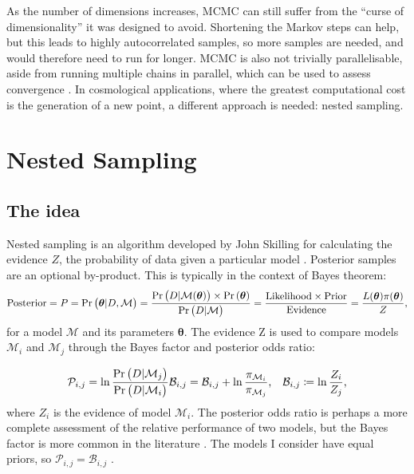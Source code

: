 \documentclass{article}
\begin{document}
As the number of dimensions increases, MCMC can still suffer from the ``curse of dimensionality'' it was designed to avoid. Shortening the Markov steps can help, but this leads to highly autocorrelated samples, so more samples are needed, and would therefore need to run for longer. MCMC is also not trivially parallelisable, aside from running multiple chains in parallel, which can be used to assess convergence \cite{mcmc-convergence}. In cosmological applications, where the greatest computational cost is the generation of a new point, a different approach is needed: nested sampling.


\section{Nested Sampling}
\subsection{The idea}
\label{sec:the-idea}
Nested sampling is an algorithm developed by John Skilling for calculating the evidence $Z$, the probability of data given a particular model \cite{skilling, Ashton_2022}. Posterior samples are an optional by-product. This is typically in the context of Bayes theorem:
\begin{equation}
  \textrm{Posterior} = P = \Pr\left(\bm{\theta}| D, \mathcal{M}\right) = \frac{\Pr\left(D|\mathcal{M}(\bm\theta)\right) \times \Pr\left(\bm\theta\right)}{\Pr\left(D|\mathcal{M}\right)} = \frac{\textrm{Likelihood} \times \textrm{Prior}}{\textrm{Evidence}} = \frac{L(\bm\theta) \pi(\bm{\theta})}{Z}\textrm,
  \label{bayes}
\end{equation}
%
for a model $\mathcal{M}$ and its parameters $\bm{\theta}$. The evidence Z is used to compare models $\mathcal{M}_i$ and $\mathcal{M}_j$ through the Bayes factor and posterior odds ratio:

\begin{equation}
  \mathcal{P}_{i, j} = \ln\frac{\Pr\left(D|\mathcal{M}_j\right)}{\Pr\left(D|\mathcal{M}_i\right)}
  \mathcal{B}_{i, j} = \mathcal{B}_{i, j} + \ln\frac{\pi_{\mathcal{M}_i}}{\pi_{\mathcal{M}_j}} \textrm, \quad \mathcal B_{i, j} \coloneqq \ln\frac{Z_i}{Z_j} \textrm,
\end{equation}
%
where $Z_i$ is the evidence of model $\mathcal M_i$. The posterior odds ratio is perhaps a more complete assessment of the relative performance of two models, but the Bayes factor is more common in the literature \cite{Sonke}. The models I consider have equal priors, so $\mathcal{P}_{i,j} = \mathcal{B}_{i,j}$ \cite{Sonke}.
\end{document}
